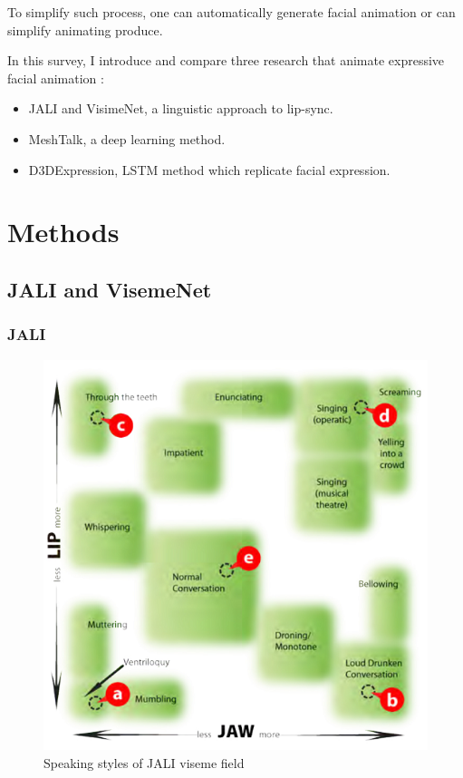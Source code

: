 \documentclass[10pt,twocolumn,letterpaper]{article}
\begin{document}
To simplify such process, one can automatically generate facial animation or can simplify animating produce.

In this survey, I introduce and compare three research that animate expressive facial animation :
\begin{itemize}
 \item JALI\cite{edwardsJALIAnimatorcentricViseme2016} and VisimeNet\cite{zhouVisemenetAudiodrivenAnimatorcentric2018}, a linguistic approach to lip-sync.
 \item MeshTalk\cite{richardMeshTalk3DFace2021}, a deep learning method.
 \item D3DExpression\cite{potamiasLearningGenerateCustomized2020}, LSTM method which replicate facial expression.
\end{itemize}






\section{Methods}

\subsection{JALI and VisemeNet}

\subsubsection{JALI}
\begin{figure}
   \includegraphics[width=1.0\linewidth]{jaliStyles}
   
   \caption{Speaking styles of JALI viseme field}
   \label{fig:jaliStyles}
\end{figure}
\end{document}
